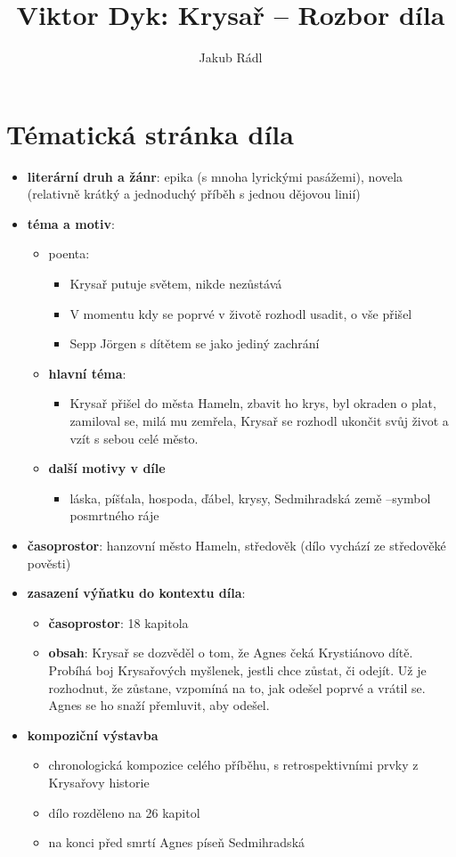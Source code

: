 \documentclass[10pt,a4paper]{article}
\date{}
\author{Jakub Rádl}
\title{Viktor Dyk: Krysař -- Rozbor díla}
\begin{document}
\maketitle


\section*{Tématická stránka díla}
\begin{itemize}
\item \textbf{literární druh a žánr}: epika (s mnoha lyrickými pasážemi), novela (relativně krátký a jednoduchý příběh s jednou dějovou linií)
\item \textbf{téma a motiv}:
	\begin{itemize}
	\item poenta:
		\begin{itemize}
		\item Krysař putuje světem, nikde nezůstává
		\item V momentu kdy se poprvé v životě rozhodl usadit, o vše přišel
		\item Sepp Jörgen s dítětem se jako jediný zachrání
		\end{itemize}
	\item \textbf{hlavní téma}: 
		\begin{itemize}
		\item Krysař přišel do města Hameln, zbavit ho krys, byl okraden o plat, zamiloval se, milá mu zemřela, Krysař se rozhodl ukončit svůj život a vzít s sebou celé město.
		\end{itemize}
	\item \textbf{další motivy v díle}
		\begin{itemize}
	\item láska, píšťala, hospoda, ďábel, krysy, Sedmihradská země --symbol posmrtného ráje
		\end{itemize}
	\end{itemize}
\item \textbf{časoprostor}: hanzovní město Hameln, středověk (dílo vychází ze středověké pověsti)
\item \textbf{zasazení výňatku do kontextu díla}:
	\begin{itemize}
	\item \textbf{časoprostor}: 18 kapitola
	\item \textbf{obsah}: Krysař se dozvěděl o tom, že Agnes čeká Krystiánovo dítě. Probíhá boj Krysařových myšlenek, jestli chce zůstat, či odejít. Už je rozhodnut, že zůstane, vzpomíná na to, jak odešel poprvé a vrátil se. Agnes se ho snaží přemluvit, aby odešel. 
	\end{itemize}
\item \textbf{kompoziční výstavba}
	\begin{itemize}
	\item chronologická kompozice celého příběhu, s retrospektivními prvky z Krysařovy historie
	\item dílo rozděleno na 26 kapitol
	\item na konci před smrtí Agnes píseň Sedmihradská
	\end{itemize}
\end{itemize}
\end{document}
